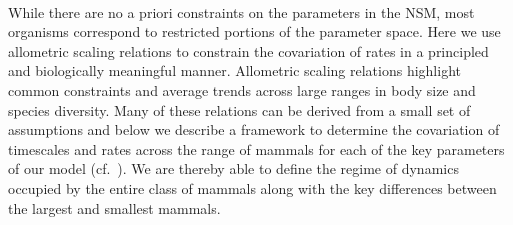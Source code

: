 \documentclass{pnastwo}
\begin{document}
\begin{article}
%



 \\
While there are no a priori constraints on the parameters in the NSM, most
organisms correspond to restricted portions of the parameter space.  Here we
use allometric scaling relations to constrain the covariation of rates in a
principled and biologically meaningful manner.  Allometric scaling relations
highlight common constraints and average trends across large ranges in body
size and species diversity. Many of these relations can be derived from a
small set of assumptions and below we describe a framework to determine the
covariation of timescales and rates across the range of mammals for each of
the key parameters of our model (cf.~\cite{Yodzis:1992hg}).  We are thereby
able to define the regime of dynamics occupied by the entire class of mammals
along with the key differences between the largest and smallest mammals.



\end{article}
\end{document}
